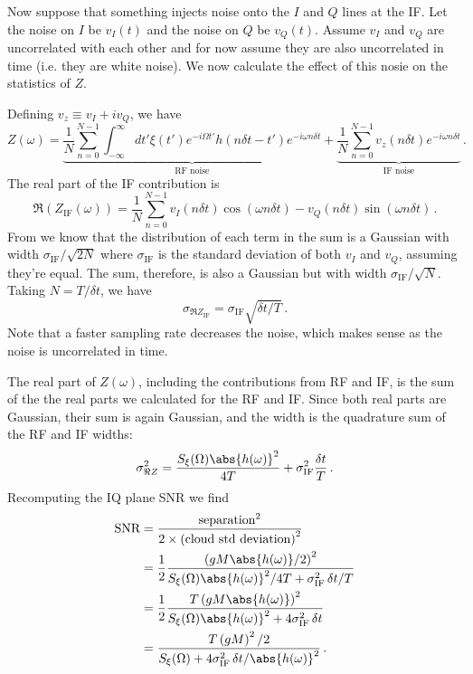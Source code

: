 
Now suppose that something injects noise onto the $I$ and $Q$ lines at the IF.
Let the noise on $I$ be $v_I(t)$ and the noise on $Q$ be $v_Q(t)$.
Assume $v_I$ and $v_Q$ are uncorrelated with each other and for now assume they are also uncorrelated in time (i.e. they are white noise).
We now calculate the effect of this nosie on the statistics of $Z$.

Defining $v_z \equiv v_I + i v_Q$, we have
\begin{equation}
Z(\omega) =
\underbrace{\frac{1}{N}\sum_{n=0}^{N-1}\int_{-\infty}^\infty dt' \xi(t')
e^{-i \Omega t'} h(n \delta t - t') e^{-i \omega n \delta t}
}_\text{RF noise}
+
\underbrace{
\frac{1}{N} \sum_{n=0}^{N-1} v_z(n \delta t) e^{-i \omega n \delta t}
}_\text{IF noise}
\, .
\end{equation}
The real part of the IF contribution is
\begin{equation}
  \Re \left( Z_\text{IF} (\omega) \right) = \frac{1}{N} \sum_{n=0}^{N-1}
      v_I(n \delta t) \cos(\omega n \delta t)
    - v_Q(n \delta t) \sin(\omega n \delta t)
  \, .
\end{equation}
From \cite{Sank:whiteNoiseDFT} we know that the distribution of each term in the sum is a Gaussian with width $\sigma_\text{IF} / \sqrt{2N}$ where $\sigma_\text{IF}$ is the standard deviation of both $v_I$ and $v_Q$, assuming they're equal.
The sum, therefore, is also a Gaussian but with width $\sigma_\text{IF} / \sqrt{N}$.
Taking $N = T / \delta t$, we have
\begin{equation}
  \sigma_{\Re Z_\text{IF}} = \sigma_\text{IF} \sqrt{\delta t / T} \, .
\end{equation}
Note that a faster sampling rate decreases the noise, which makes sense as the noise is uncorrelated in time.


The real part of $Z(\omega)$, including the contributions from RF and IF, is the sum of the the real parts we calculated for the RF and IF.
Since both real parts are Gaussian, their sum is again Gaussian, and the width is the quadrature sum of the RF and IF widths:
\begin{equation}
  \sigma_{\Re Z}^2 =
    \frac{S_\xi(\Omega) \abs{h(\omega)}^2}{4T}
    + \sigma_\text{IF}^2 \frac{\delta t}{T} \, .
\end{equation}
Recomputing the IQ plane SNR we find
\begin{align}
  \text{SNR}
    &= \frac{\text{separation}^2}{2 \times \left( \text{cloud std deviation} \right)^2} \nonumber \\
    &= \frac{1}{2}
       \frac{\left( g M \abs{h(\omega)} / 2 \right)^2}
            {S_\xi(\Omega) \abs{h(\omega)}^2 / 4T + \sigma_\text{IF}^2 \, \delta t / T} \nonumber \\
    &= \frac{1}{2}
       \frac{T \left( g M \abs{h(\omega)} \right)^2}
            {S_\xi(\Omega) \abs{h(\omega)}^2 + 4 \sigma_\text{IF}^2 \, \delta t} \nonumber \\
    &= \frac{T \left( g M \right)^2 / 2}
            {S_\xi(\Omega) + 4 \sigma_\text{IF}^2 \, \delta t / \abs{h(\omega)}^2} \nonumber
  \, .
\end{align}
